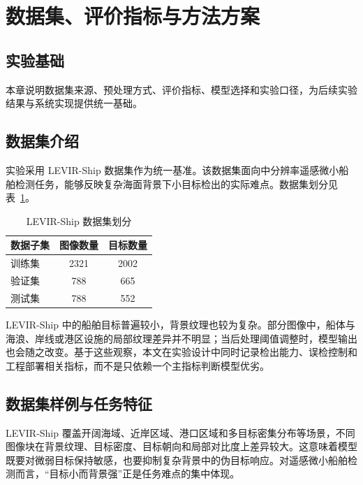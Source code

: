 \section{数据集、评价指标与方法方案}\label{sec:method}

\subsection{实验基础}

本章说明数据集来源、预处理方式、评价指标、模型选择和实验口径，为后续实验结果与系统实现提供统一基础。

\subsection{数据集介绍}

实验采用 LEVIR-Ship 数据集作为统一基准\cite{chen2022_tinyship_drenet}。该数据集面向中分辨率遥感微小船舶检测任务，能够反映复杂海面背景下小目标检出的实际难点。数据集划分见表~\ref{tab:ch3_dataset_split}。

\begin{table}[htbp]
  \centering
  \caption{LEVIR-Ship 数据集划分}
  \label{tab:ch3_dataset_split}
  \begin{tabular}{lcc}
    \toprule
    数据子集 & 图像数量 & 目标数量 \\
    \midrule
    训练集 & 2321 & 2002 \\
    验证集 & 788 & 665 \\
    测试集 & 788 & 552 \\
    \bottomrule
  \end{tabular}
\end{table}

LEVIR-Ship 中的船舶目标普遍较小，背景纹理也较为复杂。部分图像中，船体与海浪、岸线或港区设施的局部纹理差异并不明显；当后处理阈值调整时，模型输出也会随之改变。基于这些观察，本文在实验设计中同时记录检出能力、误检控制和工程部署相关指标，而不是只依赖一个主指标判断模型优劣。

\subsection{数据集样例与任务特征}

LEVIR-Ship 覆盖开阔海域、近岸区域、港口区域和多目标密集分布等场景，不同图像块在背景纹理、目标密度、目标朝向和局部对比度上差异较大。这意味着模型既要对微弱目标保持敏感，也要抑制复杂背景中的伪目标响应。对遥感微小船舶检测而言，“目标小而背景强”正是任务难点的集中体现。

